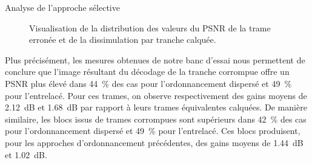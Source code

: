 \begin{section}{Analyse de l'approche sélective}
\begin{figure}
	\caption[PSNR de la trame erronée et de la dissimulation par tranche
calquée]{Visualisation de la distribution des valeurs du PSNR de la trame erronée et de la dissimulation par tranche calquée.}
	\label{fig-ScVsErroneous}
	\vspace{2em}
\end{figure}

Plus précisément, les mesures obtenues de notre banc d'essai nous permettent de
conclure que l'image résultant du décodage de la tranche corrompue offre un
PSNR plus élevé dans 44~\% des cas pour l'ordonnancement dispersé et 49~\% pour
l'entrelacé. Pour ces trames, on observe respectivement des gains moyens de
2.12~dB et 1.68~dB par rapport à leurs trames équivalentes calquées. De manière
similaire, les blocs issus de trames corrompues sont supérieurs dans 42~\% des
cas pour l'ordonnancement dispersé et 49~\% pour l'entrelacé. Ces blocs
produisent, pour les approches d'ordonnancement précédentes, des gains moyens de
1.44~dB et 1.02~dB.


\end{section}

